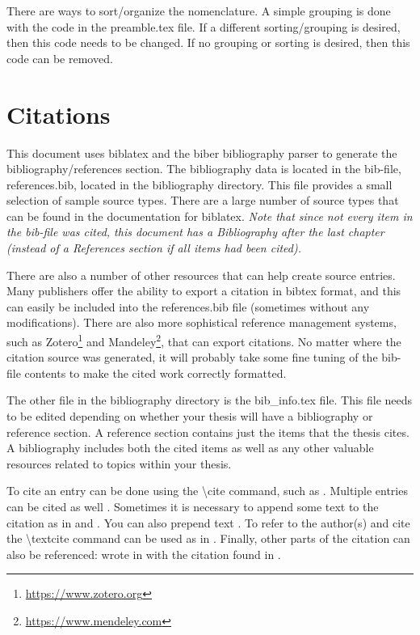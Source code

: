     There are ways to sort/organize the nomenclature.
    A simple grouping is done with the code in the preamble.tex file.
    If a different sorting/grouping is desired, then this code needs to be changed.
    If no grouping or sorting is desired, then this code can be removed.

\section{Citations} \label{sec:Citations}
    This document uses biblatex and the biber bibliography parser to generate the bibliography/references section.
    The bibliography data is located in the bib-file, references.bib, located in the bibliography directory.
    This file provides a small selection of sample source types.
    There are a large number of source types that can be found in the documentation for biblatex.
    \emph{Note that since not every item in the bib-file was cited, this document has a Bibliography after the last chapter (instead of a References section if all items had been cited).}

    There are also a number of other resources that can help create source entries.
    Many publishers offer the ability to export a citation in bibtex format, and this can easily be included into the references.bib file (sometimes without any modifications).
    There are also more sophistical reference management systems, such as Zotero\footnote{ \url{https://www.zotero.org}} and Mandeley\footnote{\url{https://www.mendeley.com}}, that can export citations.
    No matter where the citation source was generated, it will probably take some fine tuning of the bib-file contents to make the cited work correctly formatted.

    The other file in the bibliography directory is the bib\_info.tex file.
    This file needs to be edited depending on whether your thesis will have a bibliography or reference section.
    A reference section contains just the items that the thesis cites.
    A bibliography includes both the cited items as well as any other valuable resources related to topics within your thesis.

    To cite an entry can be done using the \textbackslash cite command, such as \cite{cpthesis_github}.
    Multiple entries can be cited as well \cite{drela1986a,dryden1943a,einstein1905,lopez2007a}.
    Sometimes it is necessary to append some text to the citation as in \cite[135]{dryden1943a} and \cite[section 2]{head1958a}.
    You can also prepend text \cite[such as][120]{Koutsovasilis2008}.
    To refer to the author(s) and cite the \textbackslash textcite command can be used as in \textcite{dirac1981}.
    Finally, other parts of the citation can also be referenced: \citeauthor{einstein1905} wrote  in \citeyear{einstein1905} with the citation found in \cite{einstein1905}.

